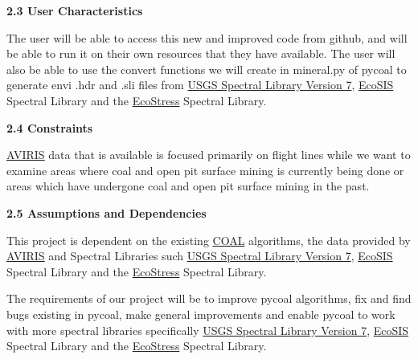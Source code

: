 \documentclass[a4paper,12pt]{article}
\begin{document}
\noindent \textbf{2.3 User Characteristics}\newline


\noindent The user will be able to access this new and improved code from github, and will be able to run it on their own resources that they have available.\newline
\noindent The user will also be able to use the convert functions we will create in mineral.py of pycoal to generate envi .hdr and .sli files from \href{https://speclab.cr.usgs.gov/spectral-lib.html}{USGS Spectral Library Version 7}, \href{https://ecosis.org/}{EcoSIS} Spectral Library and the \href{https://speclib.jpl.nasa.gov/}{EcoStress} Spectral Library. \newline


\noindent \textbf{2.4 Constraints}\newline

\noindent \href{https://aviris.jpl.nasa.gov/}{AVIRIS} data that is available is focused primarily on flight lines while we want to examine areas where coal and open pit surface mining is currently being done or areas which have undergone coal and open pit surface mining in the past. \newline


\noindent \textbf{2.5 Assumptions and Dependencies}\newline


\noindent This project is dependent on the existing \href{https://capstone-coal.github.io/}{COAL} algorithms, the data provided by \href{https://aviris.jpl.nasa.gov/}{AVIRIS} and Spectral Libraries such \href{https://speclab.cr.usgs.gov/spectral-lib.html}{USGS Spectral Library Version 7}, \href{https://ecosis.org/}{EcoSIS} Spectral Library and the \href{https://speclib.jpl.nasa.gov/}{EcoStress} Spectral Library.\newline


\newline


\noindent  The requirements of our project will be to improve pycoal algorithms, fix and find bugs existing in pycoal, make general improvements and enable pycoal to work with more spectral libraries specifically \href{https://speclab.cr.usgs.gov/spectral-lib.html}{USGS Spectral Library Version 7}, \href{https://ecosis.org/}{EcoSIS} Spectral Library and the \href{https://speclib.jpl.nasa.gov/}{EcoStress} Spectral Library.\newline
\end{document}
